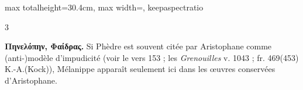 \documentclass[11pt,twoside]{book}
\newcommand{\currHeadLE}{}
\newcommand{\currHeadRE}{}
\newcommand{\currHeadLO}{}
\newcommand{\currHeadRO}{}
\newcommand{\italique}[1]{\textit{#1}}
\newcommand{\R}{\textbf{R}}
\begin{document}
\begin{adjustbox}{max totalheight=30.4cm, max width=\textwidth, keepaspectratio}
\begin{minipage}{\textwidth}
{\begin{multicols}{3}
\par\vspace{1.5pt}
 \textbf{Πηνελόπην, Φαίδρας.} Si Phèdre est souvent citée par Aristophane comme (anti-)modèle d'impudicité (voir le vers 153 ; les \italique{Grenouilles} v. 1043 ; fr. 469(453) K.-A.(Kock)), Mélanippe apparaît seulement ici dans les œuvres conservées d'Aristophane.
\par\end{multicols}}
\end{minipage}\end{adjustbox}
\clearpage\ifodd\value{page}\hbox{}\newpage\fi
\renewcommand{\currHeadLE}{ΑΡΙΣΤΟΦΑΝΟΥΣ ΘΕΣΜΟΦΟΡΙΑΖΟΥΣΑΙ · CODEX RAVENNAS 429 (\R)}
\renewcommand{\currHeadRE}{Folio f. 169r (Classense 171r) · vv. 551–589}
\renewcommand{\currHeadLO}{FAC-SIMILÉ DU CODEX RAVENNAS 429 (\R) · f. 169r (Classense 171r)}
\renewcommand{\currHeadRO}{vv. 551–589 · Planche recadrée sur la zone écrite et harmonisée}
\end{document}
